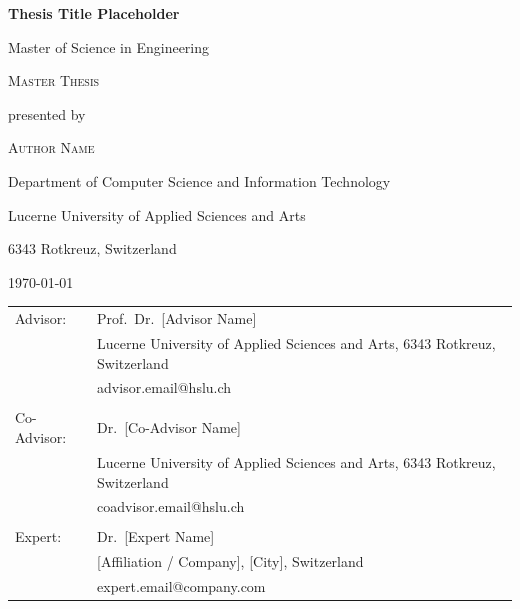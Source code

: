\begin{titlepage}
    \centering
    \vspace*{1.5cm}
    
    {\huge\bfseries Thesis Title Placeholder\par}
    
    \vspace{2.5cm}
    
    {\large Master of Science in Engineering \par
    \vspace{0.3cm}
    \scshape\Large Master Thesis\par} %
    
    \vspace{1.5cm}
    
    {\large presented by\par
    \vspace{0.3cm}
    \scshape\Large Author Name\par}
    
    \vspace{1.5cm}
    
    {\large Department of Computer Science and Information Technology\par
    Lucerne University of Applied Sciences and Arts\par
    6343 Rotkreuz, Switzerland\par}
    
    \vfill
    {\large \today\par}
    \vfill

    \begin{tabular}[t]{l l}
        Advisor:    & Prof.\ Dr.\ [Advisor Name] \\
                    & Lucerne University of Applied Sciences and Arts, 6343 Rotkreuz, Switzerland \\
                    & advisor.email@hslu.ch \\
                    & \\
        Co-Advisor: & Dr.\ [Co-Advisor Name] \\
                    & Lucerne University of Applied Sciences and Arts, 6343 Rotkreuz, Switzerland \\
                    & coadvisor.email@hslu.ch \\
                    & \\
        Expert:     & Dr.\ [Expert Name] \\
                    & [Affiliation / Company], [City], Switzerland \\
                    & expert.email@company.com \\
    \end{tabular}
    

\end{titlepage}
